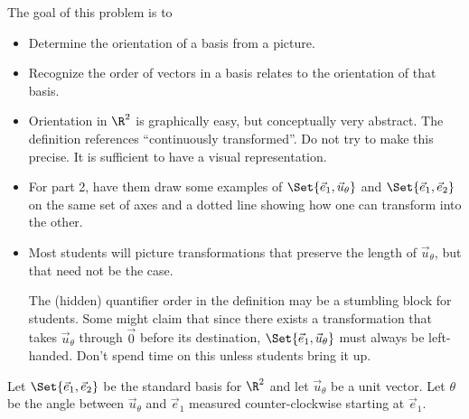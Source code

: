 \documentclass{problemset}
\newcommand{\xhat}{{\vec e_1}}
\newcommand{\yhat}{{\vec e_2}}
\begin{document}
	\question
	\begin{annotation}
		\begin{goals}

			The goal of this problem is to
			\begin{itemize}
				\item Determine the orientation of a basis from a  picture.
				\item Recognize the order of vectors in a basis relates to the
					orientation of that basis.
			\end{itemize}
		\end{goals}

		\begin{notes}
			\begin{itemize}
				\item Orientation in $\R^2$ is graphically easy, but conceptually very abstract.
					The definition references ``continuously transformed''. Do not try
					to make this precise. It is sufficient to have a visual representation.
				\item For part 2, have them draw some examples of $\Set{\xhat, \vec u_\theta}$
					and $\Set{\xhat, \yhat}$ on the same set of axes and a dotted line
					showing how one can transform into the other.
				\item Most students will picture transformations that preserve the length of $\vec u_\theta$,
					but that need not be the case.

					The (hidden) quantifier order in the definition may be a stumbling block for students. Some might
					claim that since there exists a transformation that takes $\vec u_\theta$ through $\vec 0$
					before its destination, $\Set{\xhat,\vec u_\theta}$ must always be left-handed.
					Don't spend time on this unless students bring it up.
			\end{itemize}
		\end{notes}
	\end{annotation}
	Let $\Set{\xhat,\yhat}$ be the standard basis for $\R^2$ and let
	$\vec u_{\theta}$ be a unit vector. Let $\theta$ be the angle between $\vec u_{\theta}$ and
	$\xhat$ measured counter-clockwise starting at $\xhat$.
\end{document}
